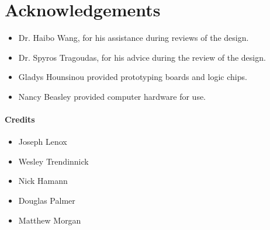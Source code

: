 \section{Acknowledgements}
\begin{itemize}
\item Dr. Haibo Wang, for his assistance during reviews of the design. 
\item Dr. Spyros Tragoudas, for his advice during the review of the design.
\item Gladys Hounsinou provided prototyping boards and logic chips.
\item Nancy Beasley provided computer hardware for use.
\end{itemize}

\paragraph{Credits}
\begin{itemize}
\item Joseph Lenox
\item Wesley Trendinnick
\item Nick Hamann
\item Douglas Palmer
\item Matthew Morgan
\end{itemize}
